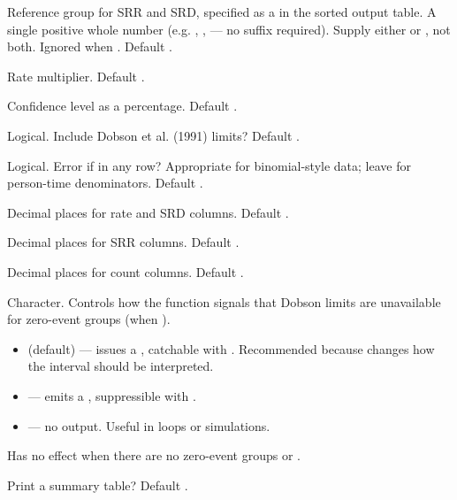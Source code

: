 \documentclass[a4paper]{book}
\begin{document}
\begin{Arguments}
\begin{ldescription}
\item[\code{ref\_index}] Reference group for SRR and SRD, specified as a
 in the sorted output table. A single positive whole
number (e.g. , ,  — no  suffix
required). Supply either  or , not both.
Ignored when . Default .

\item[\code{mult}] Rate multiplier. Default .

\item[\code{level}] Confidence level as a percentage. Default .

\item[\code{dobson}] Logical. Include Dobson et al. (1991) limits? Default .

\item[\code{check\_pop}] Logical. Error if  in any row? Appropriate
for binomial-style data; leave  for person-time denominators.
Default .

\item[\code{digits\_rate}] Decimal places for rate and SRD columns. Default .

\item[\code{digits\_ratio}] Decimal places for SRR columns. Default .

\item[\code{digits\_count}] Decimal places for count columns. Default .

\item[\code{notify}] Character. Controls how the function signals that Dobson
limits are unavailable for zero-event groups (when ).
\begin{itemize}

\item{}  (default) — issues a , catchable
with . Recommended because 
changes how the interval should be interpreted.
\item{}  — emits a , suppressible with
.
\item{}  — no output. Useful in loops or simulations.

\end{itemize}

Has no effect when there are no zero-event groups or .

\item[\code{verbose}] Print a summary table? Default .
\end{ldescription}
\end{Arguments}
\end{document}

